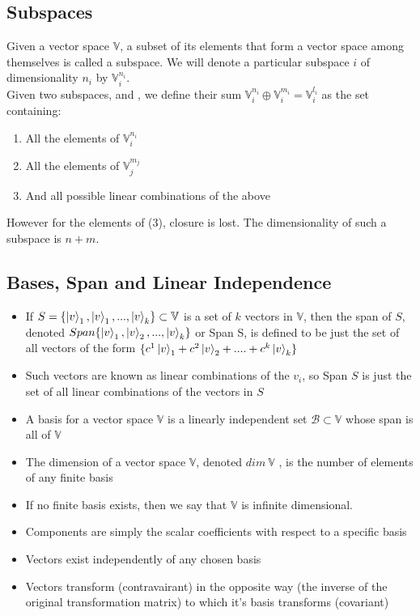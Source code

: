 \subsection{Subspaces}
Given a vector space $\mathbb{V}$, a subset of its elements that form a vector space among themselves is called a subspace. We will denote a particular subspace $i$ of dimensionality $n_{i}$ by $\mathbb{V}^{n_{i}}_{i}$.\\
   Given two subspaces, and , we define their sum $\mathbb{V}^{n_{i}}_{i} \oplus \mathbb{V}^{m_{i}}_{i} = \mathbb{V}^{l_{i}}_{i}$ as the set containing:
\begin{enumerate}
\item All the elements of $\mathbb{V}^{n_{i}}_{i}$
\item All the elements of $\mathbb{V}^{m_{j}}_{j}$
\item And all possible linear combinations of the above
\end{enumerate} 
However for the elements of (3), closure is lost. The dimensionality of such a subspace is $n + m$.
\subsection{Bases, Span and Linear Independence}
\begin{itemize}
    \item If $S = \{\ket{v}_{1},\ket{v}_{1},...,\ket{v}_{k}\} \subset \mathbb{V}$ is a set of $k$ vectors in $\mathbb{V}$, then the span of $S$, denoted $Span \{\ket{v}_{1},\ket{v}_{2},...,\ket{v}_{k} \}$ or Span S, is defined to be just the set of all vectors of the form $\{c^{1}\ket{v}_{1} + c^{2}\ket{v}_{2} + .... + c^{k}\ket{v}_{k} \}$
    \item Such vectors are known as linear combinations of the $v_i$, so Span $S$ is just the set of all linear combinations of the vectors in $S$
    \item A basis for a vector space $\mathbb{V}$ is a linearly independent set $\mathcal{B} \subset \mathbb{V}$ whose span is all of $\mathbb{V}$
    \item The dimension of a vector space $\mathbb{V}$, denoted $dim \ \mathbb{V}$ , is the number of
elements of any finite basis
\item If no finite basis exists, then we say that $\mathbb{V}$ is infinite dimensional.
\item Components are simply the scalar coefficients with respect to a specific basis
\item Vectors exist independently of any chosen basis
\item Vectors transform (contravairant) in the opposite way (the inverse of the original transformation matrix) to which it's basis transforms (covariant)
\end{itemize}

